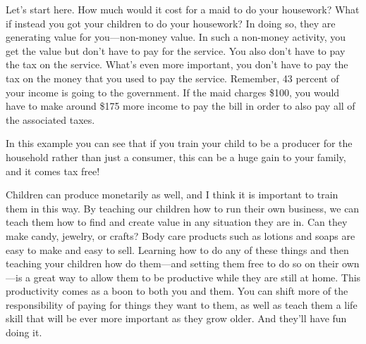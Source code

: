 Let's start here. How
much would it cost for a maid to do your housework?  What if
instead you got your
children to do your housework?  In doing so, they are generating value
for you---non-money value. In such a non-money activity, you get the
value but don't have to pay for the service. You also don't have to pay
the tax on the service.
What's even more
important, you don’t have to pay the tax on the money that you used to
pay the service. Remember, 43 percent of your income is going to the
government. If the maid charges \$100, you would have to make around
\$175 more income to pay the bill in order to also pay all of the
associated taxes.

In this example you
can see that if you train your child to be a producer for the household
rather than just a consumer, this can be a huge gain to your family,
and it comes tax free!

Children can produce monetarily as well, and I think it is important to
train them in this way. By teaching our children how to run their own
business, we can teach them how to find and create value in any
situation they are in. Can they make candy, jewelry, or crafts?  Body
care products such as lotions and soaps are easy to make and easy to
sell. Learning how to
do any of these things and then teaching your children how do them---and
setting them free to do so on their own---is a great way to allow them
to be productive while they are still
at home. This
productivity comes as a boon to both you and them. You can shift more
of the responsibility of paying for things they want to them, as well
as teach them a life skill that will be ever more important as they
grow older. And
they’ll have fun doing it.

